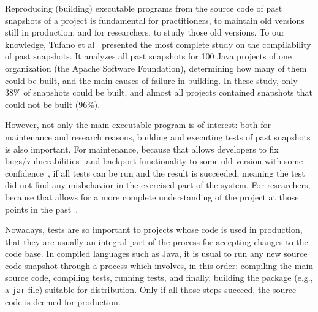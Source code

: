 
Reproducing (building) executable programs from the source code of past snapshots
 of a project is fundamental for practitioners, to maintain old versions still in production, and for researchers, to study those old versions. 
To our knowledge, Tufano et al~\cite{tufano2017there} presented the most complete study on the compilability of past snapshots.
It analyzes all past snapshots for 100 Java projects of one organization (the Apache Software Foundation), determining how many of them could be built, and the main causes of failure in building. 
In these study, only 38\% of snapshots could be built, and almost all projects contained snapshots that could not be built (96\%).

However, not only the main executable program is of interest: both for maintenance and research reasons, building and executing tests of past snapshots is also important. 
For maintenance, because that allows developers to fix bugs/vulnerabilities~\cite{bartelsoftware} and backport functionality to some old version with some confidence~\cite{tian2017mining}, if all tests can be run and the result is succeeded, meaning the test did not find any misbehavior in the exercised part of the system. 
For researchers, because that allows for a more complete understanding of the project at those points in the past~\cite{santos2019mind}.



Nowadays, tests are so important to projects whose code is used in production, that they are usually an integral part of the process for accepting changes to the code base. 
In compiled languages such as Java, it is usual to run any new source code snapshot through a process which involves, in this order: compiling the main source code, compiling tests, running tests, and finally, building the package (e.g., a \texttt{jar} file) suitable for distribution. 
Only if all those steps succeed, the source code is deemed for production.


